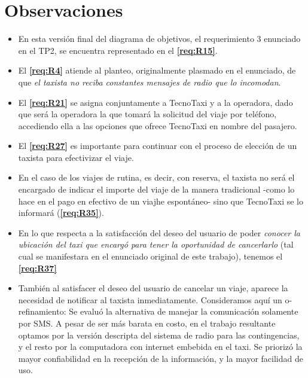 \begin{description}
	\end{description}

\section{Observaciones}
\label{sec:obs}
\begin{itemize}

\item En esta versión final del diagrama de objetivos, el requerimiento 3 enunciado en el TP2, se encuentra representado en el \textbf{\ref{req:R15}}.
\item El \textbf{\ref{req:R4}} atiende al planteo, originalmente plasmado en el enunciado, de que \emph{el taxista no reciba constantes mensajes de radio que lo incomodan}.
\item El \textbf{\ref{req:R21}} se asigna conjuntamente a TecnoTaxi y a la operadora, dado que será la operadora la que tomará la solicitud del viaje por teléfono, accediendo ella a las opciones que ofrece TecnoTaxi en nombre del pasajero.
\item El \textbf{\ref{req:R27}} es importante para continuar con el proceso de elección de un taxista para efectivizar el viaje. 
\item En el caso de los viajes de rutina, es decir, con reserva, el taxista no será el encargado de indicar el importe del viaje de la manera tradicional -como lo hace en el pago en efectivo de un viajhe espontáneo- sino que TecnoTaxi se lo informará (\textbf{\ref{req:R35}}).
\item En lo que respecta a la satisfacción del deseo del usuario de poder \emph{conocer la ubicación del taxi que encargó para tener la oportunidad de cancerlarlo }(tal cual se manifestara en el enunciado original de este trabajo), tenemos el \textbf{\ref{req:R37}}
\item También al satisfacer el deseo del usuario de cancelar un viaje, aparece la necesidad de notificar al taxista inmediatamente. Consideramos aquí un o-refinamiento: Se evaluó la alternativa de manejar la comunicación solamente por SMS. A pesar de ser más barata en costo, en el trabajo resultante optamos por la versión descripta del sistema de radio para las contingencias, y el resto por la computadora con internet embebida en el taxi. Se priorizó la mayor confiabilidad en la recepción de la información, y la mayor facilidad de uso.

\end{itemize}
